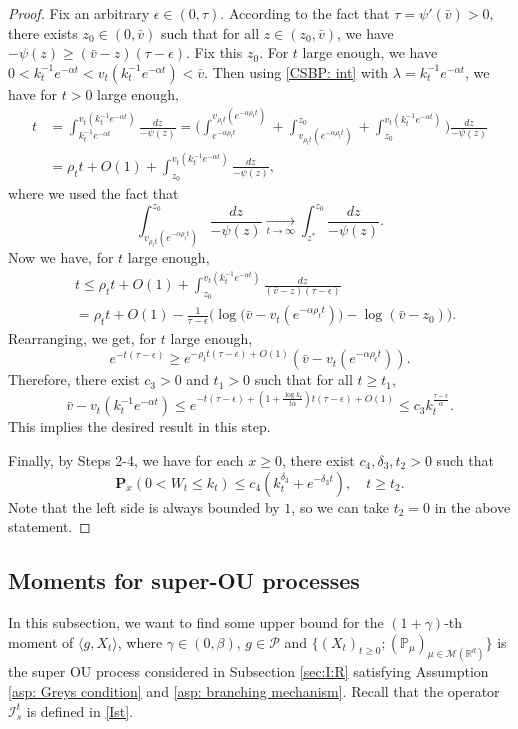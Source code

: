 \documentclass[12pt,a4paper]{amsart}
\theoremstyle{plain}
\theoremstyle{definition}
\numberwithin{equation}{section}
\begin{document}
\begin{proof}
Fix an arbitrary $\epsilon \in (0,\tau)$.
According to the fact that $\tau=\psi'(\bar v)>0$, there exists $z_0 \in (0,\bar v)$ such that for all $z\in (z_0, \bar v)$, we have $-\psi(z)\geq (\bar v - z)(\tau- \epsilon)$.
Fix this $z_0$.
For $t$ large enough, we have $0<k_t^{-1}e^{-\alpha t} < v_t(k_t^{-1}e^{-\alpha t})< \bar v$.
Then using \eqref{CSBP: int} with $\lambda=k_t^{-1} e^{-\alpha t}$, we have for $t>0$ large enough,
\begin{align}
  t
  & =\int^{v_t(k_t^{-1} e^{-\alpha t})}_{k_t^{-1} e^{-\alpha t}}\frac{dz}{-\psi(z)}
    = \Big(\int^{v_{\rho_t t}(e^{-\alpha \rho_t t})}_{e^{-\alpha \rho_t t}}  + \int^{z_0}_{v_{\rho_t t}(e^{-\alpha \rho_t t})} +\int^{v_t(k_t^{-1}e^{-\alpha  t})}_{z_0}\Big)\frac{dz}{-\psi(z)} \\
  & = \rho_t t + O(1) +\int^{v_t(k_t^{-1}e^{-\alpha t})}_{z_0} \frac{dz}{-\psi(z)},
\end{align}
where we used the fact that
\[
  \int_{v_{\rho_t t}(e^{-\alpha \rho_tt})}^{z_0} \frac{dz}{-\psi(z)}
  \xrightarrow[t\to \infty] {} \int_{z^*}^{z_0} \frac{dz}{-\psi(z)}.
\]
Now we have, for $t$ large enough,
\begin{align}
  & t
    \leq  \rho_t t + O(1) + \int_{z_0}^{v_t(k_t^{-1}e^{-\alpha t})} \frac{dz}{(\bar v-z)(\tau - \epsilon)} \\
  & =  \rho_t t +O(1)- \frac{1}{\tau-\epsilon}\Big( \log \big(\bar v-v_t(e^{-\alpha \rho_t t})\big) - \log(\bar v-z_0)\Big).
\end{align}
Rearranging, we get, for $t$ large enough,
\[
  e^{-t(\tau - \epsilon)}
  \geq e^{-\rho_t t(\tau - \epsilon)+O(1)}(\bar v - v_t(e^{-\alpha \rho_t t})).
\]
Therefore, there exist $c_3>0$ and $t_1>0$ such that for all $t\geq t_1$,
\[
  \bar v - v_t(k_t^{-1} e^{-\alpha t})
  \leq e^{-t(\tau -\epsilon)+ (1+\frac{\log k_t}{t\alpha})t(\tau - \epsilon)+O(1)}
  \leq c_3k_t^{\frac{\tau - \epsilon}{\alpha}}.
\]
This implies the desired result in this step.

Finally, by Steps 2-4, we have for each $x\geq 0$, there exist $c_4, \delta_3, t_2 > 0$ such that
\[
  \mathbf P_{x}(0< W_t\leq k_t)
  \leq c_4(k_t^{\delta_3}+e^{-\delta_3 t})
  , \quad t\geq t_2.
\]
Note that the left side is always bounded by $1$, so we can take $t_2 =0$ in the above statement.
\end{proof}


\subsection{Moments for super-OU processes}
\label{sec: Moments for super-OU processes}
In this subsection,  we want to find some upper bound for the $(1+\gamma)$-th moment of $\langle g ,X_t \rangle$, where $\gamma \in (0,\beta)$, $g\in \mathcal P$ and $\{(X_t)_{t\geq 0}; (\mathbb P_\mu)_{\mu \in \mathcal M(\mathbb R^d)}\}$ is the super OU process considered in Subsection \ref{sec:I:R} satisfying Assumption \ref{asp: Greys condition} and \ref{asp: branching mechanism}.
Recall that the operator $\mathcal{I}^t_s$ is defined in \eqref{Ist}.
\end{document}
